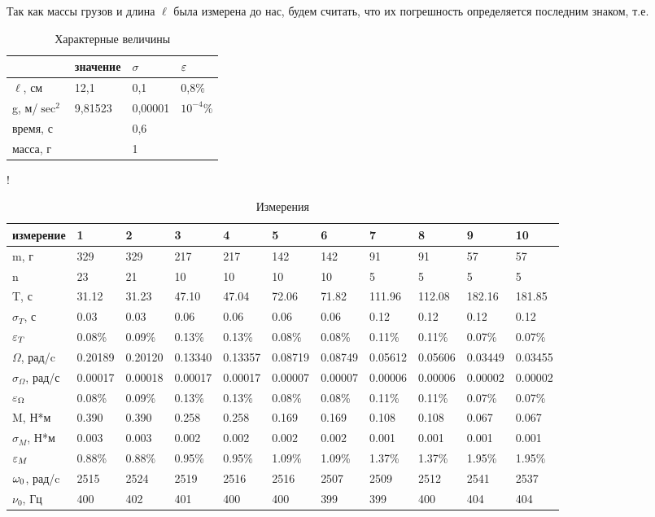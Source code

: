 \documentclass[a4paper,12pt]{article} %
\begin{document}
\begin{enumerate}
Так как массы грузов и длина $\ell$ была измерена до нас, будем считать, что их погрешность определяется последним знаком, т.е.

\begin{table} [H] \center
\begin{tabular}{l|l|l|l}
&значение&$\sigma$&$\varepsilon$\\
\hline
$\ell$, см&12,1&0,1&0,8\%\\
g, м/$\sec^2$&9,81523&0,00001&$10^{-4}$\%\\
время, с&&0,6&\\
масса, г&&1&\\
\end{tabular}
\caption[Таблица 1]{Характерные величины \label{table:1}}
\end{table}


\begin{table} [H]
\resizebox {\textwidth} {!} {
\begin{tabular} {l|llllllllll}
измерение&1&2&3&4&5&6&7&8&9&10\\
\hline
m, г&329&329&217&217&142&142&91&91&57&57\\
n&23&21&10&10&10&10&5&5&5&5\\
T, с&31.12&31.23&47.10&47.04&72.06&71.82&111.96&112.08&182.16&181.85\\
$\sigma_{T}$, с&0.03&0.03&0.06&0.06&0.06&0.06&0.12&0.12&0.12&0.12\\
$\varepsilon_{T}$&0.08\%&0.09\%&0.13\%&0.13\%&0.08\%&0.08\%&0.11\%&0.11\%&0.07\%&0.07\%\\
$\Omega$, рад/c&0.20189&0.20120&0.13340&0.13357&0.08719&0.08749&0.05612&0.05606&0.03449&0.03455\\
$\sigma_{\Omega}$, рад/с&0.00017&0.00018&0.00017&0.00017&0.00007&0.00007&0.00006&0.00006&0.00002&0.00002\\
$\varepsilon_{\Omega}$&0.08\%&0.09\%&0.13\%&0.13\%&0.08\%&0.08\%&0.11\%&0.11\%&0.07\%&0.07\%\\
M, Н*м&0.390&0.390&0.258&0.258&0.169&0.169&0.108&0.108&0.067&0.067\\
$\sigma_{M}$, Н*м&0.003&0.003&0.002&0.002&0.002&0.002&0.001&0.001&0.001&0.001\\
$\varepsilon_{M}$&0.88\%&0.88\%&0.95\%&0.95\%&1.09\%&1.09\%&1.37\%&1.37\%&1.95\%&1.95\%\\
$\omega_0$, рад/c&2515&2524&2519&2516&2516&2507&2509&2512&2541&2537\\
$\nu_0$, Гц&400&402&401&400&400&399&399&400&404&404\\
\end{tabular} 
}
\caption{Измерения \label{table:2}}
\end{table}



\end{enumerate}
\end{document}
